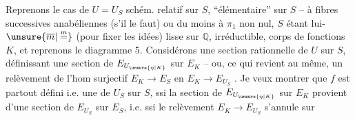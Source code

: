 Reprenons le cas de $U=U_S$ schém. relatif sur $S$, ``élémentaire'' sur $S$ -- à fibres successives anabéliennes (s'il le faut) ou du moins à $\pi_1$ non nul, $S$ étant lui-$\unsure{\overline m|\overset{m}{=}}$ (pour fixer les idées) lisse sur $\mathbb{Q}$, irréductible, corps de fonctions $K$, et reprenons le diagramme 5. Considérons une section rationnelle  de $U$ sur $S$, définissant une section de $E_{U_{\unsure{\eta|K}}}$ sur $E_K$ -- ou, ce qui revient au même, un relèvement de l'hom surjectif $E_K\longrightarrow E_S$ en $E_K\longrightarrow E_{U_S}$ . Je veux montrer que $f$ est partout défini i.e. une   de $U_S$ sur $S$, ssi la section de $E_{U_{\unsure{\eta|K}}}$ sur $E_K$ provient d'une section de $E_{U_S}$ sur $E_S$, i.e. ssi le relèvement $E_K\longrightarrow E_{U_S}$ s'annule sur
